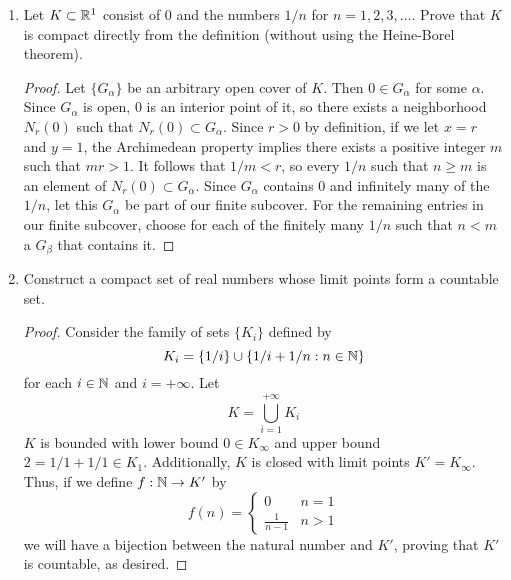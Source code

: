 \documentclass[../psets.tex]{subfiles}
\begin{document}
\begin{enumerate}[label={\textbf{\arabic*.}}]
\begin{proof}
\begin{align*}
            &\leq \frac{|x-z|}{1+|x-z|}+\frac{|z-y|}{1+|z-y|}\\
            &= d(x,z)+d(z,y)
        \end{align*}
        as desired.
    \end{proof}
    \item Let $K\subset\mathbb{R}^1$ consist of 0 and the numbers $1/n$ for $n=1,2,3,\dots$. Prove that $K$ is compact directly from the definition (without using the Heine-Borel theorem).
    \begin{proof}
        Let $\{G_\alpha\}$ be an arbitrary open cover of $K$. Then $0\in G_\alpha$ for some $\alpha$. Since $G_\alpha$ is open, 0 is an interior point of it, so there exists a neighborhood $N_r(0)$ such that $N_r(0)\subset G_\alpha$. Since $r>0$ by definition, if we let $x=r$ and $y=1$, the Archimedean property implies there exists a positive integer $m$ such that $mr>1$. It follows that $1/m<r$, so every $1/n$ such that $n\geq m$ is an element of $N_r(0)\subset G_\alpha$. Since $G_\alpha$ contains 0 and infinitely many of the $1/n$, let this $G_\alpha$ be part of our finite subcover. For the remaining entries in our finite subcover, choose for each of the finitely many $1/n$ such that $n<m$ a $G_\beta$ that contains it.
    \end{proof}
    \item Construct a compact set of real numbers whose limit points form a countable set.
    \begin{proof}
        Consider the family of sets $\{K_i\}$ defined by
        \begin{equation*}
            K_i = \{1/i\}\cup\{1/i+1/n:n\in\mathbb{N}\}
        \end{equation*}
        for each $i\in\mathbb{N}$ and $i=+\infty$. Let
        \begin{equation*}
            K = \bigcup_{i=1}^{+\infty} K_i
        \end{equation*}
        $K$ is bounded with lower bound $0\in K_\infty$ and upper bound $2=1/1+1/1\in K_1$. Additionally, $K$ is closed with limit points $K'=K_\infty$. Thus, if we define $f:\mathbb{N}\to K'$ by
        \begin{equation*}
            f(n) =
            \begin{cases}
                0 & n=1\\
                \frac{1}{n-1} & n>1
            \end{cases}
        \end{equation*}
        we will have a bijection between the natural number and $K'$, proving that $K'$ is countable, as desired.

\end{proof}
\end{enumerate}
\end{document}
